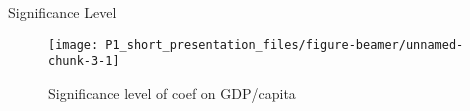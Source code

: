 \documentclass[
  ignorenonframetext,
]{beamer}
\begin{document}
\begin{frame}{Significance Level}
\protect\hypertarget{significance-level}{}

\begin{figure}

{\centering \texttt{[image: P1\_short\_presentation\_files/figure-beamer/unnamed-chunk-3-1]} 

}

\caption{Significance level of coef on GDP/capita}\label{fig:unnamed-chunk-3}
\end{figure}

\end{frame}
\end{document}
